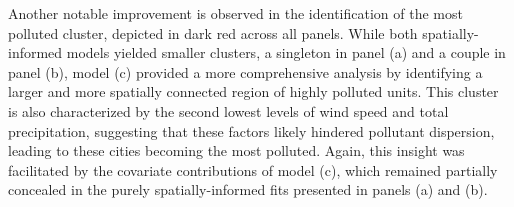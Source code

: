 \documentclass[12pt,	%
	a4paper,		%
	twoside,		%
	openright,		%
	titlepage,%
	]{book}
\theoremstyle{definition}
\begin{document}
Another notable improvement is observed in the identification of the most polluted cluster, depicted in dark red across all panels. While both spatially-informed models yielded smaller clusters, a singleton in panel (a) and a couple in panel (b), model (c) provided a more comprehensive analysis by identifying a larger and more spatially connected region of highly polluted units. This cluster is also characterized by the second lowest levels of wind speed and total precipitation, suggesting that these factors likely hindered pollutant dispersion, leading to these cities becoming the most polluted. Again, this insight was facilitated by the covariate contributions of model (c), which remained partially concealed in the purely spatially-informed fits presented in panels (a) and (b).



\end{document}
